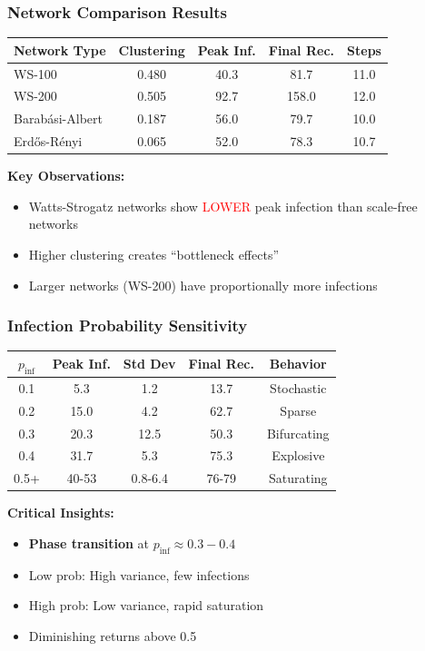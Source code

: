 \documentclass{beamer}
\begin{document}
\begin{frame}
\frametitle{Network Comparison Results}

\begin{table}
\centering
\begin{tabular}{lcccc}
\toprule
\textbf{Network Type} & \textbf{Clustering} & \textbf{Peak Inf.} & \textbf{Final Rec.} & \textbf{Steps} \\
\midrule
WS-100 & 0.480 & 40.3 & 81.7 & 11.0 \\
WS-200 & 0.505 & 92.7 & 158.0 & 12.0 \\
Barabási-Albert & 0.187 & 56.0 & 79.7 & 10.0 \\
Erdős-Rényi & 0.065 & 52.0 & 78.3 & 10.7 \\
\bottomrule
\end{tabular}
\end{table}

\vspace{0.5cm}

\textbf{Key Observations:}
\begin{itemize}
    \item Watts-Strogatz networks show \textcolor{red}{LOWER} peak infection than scale-free networks
    \item Higher clustering creates ``bottleneck effects''
    \item Larger networks (WS-200) have proportionally more infections
\end{itemize}
\end{frame}

\begin{frame}
\frametitle{Infection Probability Sensitivity}

\begin{center}
\begin{tabular}{ccccc}
\toprule
$p_{\text{inf}}$ & Peak Inf. & Std Dev & Final Rec. & Behavior \\
\midrule
0.1 & 5.3 & 1.2 & 13.7 & Stochastic \\
0.2 & 15.0 & 4.2 & 62.7 & Sparse \\
0.3 & 20.3 & 12.5 & 50.3 & Bifurcating \\
0.4 & 31.7 & 5.3 & 75.3 & Explosive \\
0.5+ & 40-53 & 0.8-6.4 & 76-79 & Saturating \\
\bottomrule
\end{tabular}
\end{center}

\vspace{1cm}

\textbf{Critical Insights:}
\begin{itemize}
    \item \textbf{Phase transition} at $p_{\text{inf}} \approx 0.3-0.4$
    \item Low prob: High variance, few infections
    \item High prob: Low variance, rapid saturation
    \item Diminishing returns above 0.5
\end{itemize}
\end{frame}
\end{document}
